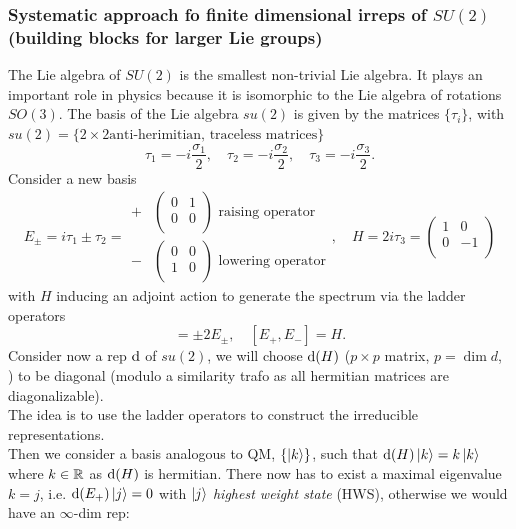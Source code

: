\subsubsection{Systematic approach fo finite dimensional irreps of $SU(2)$ (building blocks for larger Lie groups)}
\label{subsubsec:irrepssu2}
The Lie algebra of $SU (2)$ is the smallest non-trivial Lie algebra. It plays an important role in
physics because it is isomorphic to the Lie algebra of rotations $SO(3)$. The basis of the Lie algebra $su(2)$ is given by the matrices $\{\tau_i\}$, with $su(2)=\{2\times2 \text{anti-herimitian, traceless matrices} \}$
\begin{equation*}
\tau_1 = -i \frac{\sigma_1}{2}, \quad \tau_2= -i \frac{\sigma_2}{2},\quad \tau_3=-i\frac{\sigma_3}{2}.
\end{equation*}
Consider a new basis
\begin{equation*}
	E_\pm=i\tau_1\pm\tau_2=
	\begin{array}{ll}
		+&\begin{pmatrix}
		0&1\\
		0&0\\
	\end{pmatrix} \text{ raising operator } \\
- &
\begin{pmatrix}
	0&0\\
	1&0\\
\end{pmatrix}
\text{ lowering operator}
\end{array},\quad
H=2i\tau_3 = \begin{pmatrix}
	1 & 0\\
	0 &-1\\
\end{pmatrix}
\end{equation*}
with $H$ inducing an adjoint action to generate the spectrum via the ladder operators
\begin{equation*}
	[H,E_\pm] = \pm 2 E_\pm,\quad [E_+,E_-]=H.
\end{equation*}
Consider now a rep $\mathrm{d}$ of $su(2)$, we will choose $\mathrm{d}(H)$ ($p\times p$ matrix, $p=\dim d$, ) to be diagonal (modulo a similarity trafo as all hermitian matrices are diagonalizable). \\
The idea is to use the ladder operators to construct the irreducible representations.\\
Then we consider a basis analogous to QM, $\{\ket{k} \}$, such that $\mathrm{d} (H) \ket{k}=k\ket{k}$ where $k\in \mathbb{R}$ as $\mathrm{d} (H)$ is hermitian. There now has to exist a maximal eigenvalue $k=j$, i.e. $\mathrm{d}(E_+) \ket{j}=0$ with $\ket{j}$ \emph{highest weight state} (HWS), otherwise we would have an $\infty$-dim rep:
